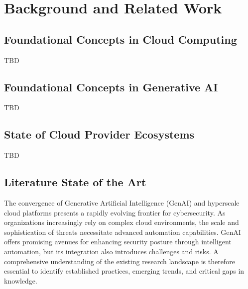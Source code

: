 
\chapter{Background and Related Work} %
\label{chap:Background and Related Work}

\section{Foundational Concepts in Cloud Computing} %
\label{sec:Foundational Concepts in Cloud Computing}

TBD


\section{Foundational Concepts in Generative AI} %
\label{sec:Foundational Concepts in Generative AI}

TBD


\section{State of Cloud Provider Ecosystems} %
\label{sec:State of Cloud Provider Ecosystems}

TBD


\section{Literature State of the Art} %
\label{sec:State of the Art}

The convergence of Generative Artificial Intelligence (GenAI) and hyperscale cloud platforms presents a rapidly evolving frontier for cybersecurity. As organizations increasingly rely on complex cloud environments, the scale and sophistication of threats necessitate advanced automation capabilities. GenAI offers promising avenues for enhancing security posture through intelligent automation, but its integration also introduces challenges and risks. A comprehensive understanding of the existing research landscape is therefore essential to identify established practices, emerging trends, and critical gaps in knowledge.

